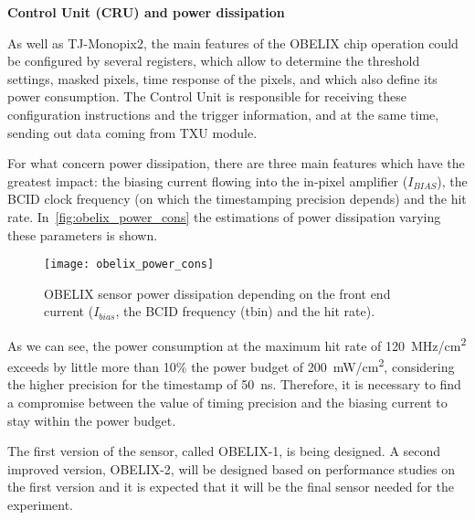 \newpage
\begin{description}
\item \textbf{Control Unit (CRU) and power dissipation}
\end{description}


As well as TJ-Monopix2, the main features of the OBELIX chip operation could be configured by several registers, which allow to determine the threshold settings, masked pixels, time response of the pixels, and which also define its power consumption. The Control Unit is responsible for receiving these configuration instructions and the trigger information, and at the same time, sending out data coming from TXU module.

For what concern power dissipation, there are three main features which have the greatest impact: the biasing current flowing into the in-pixel amplifier (\textit{$I_{BIAS}$}), the BCID clock frequency (on which the timestamping precision depends) and the hit rate. In~\autoref{fig:obelix_power_cons} the estimations of power dissipation varying these parameters is shown.

\begin{figure}[h!]
\centering
\texttt{[image: obelix\_power\_cons]}
\caption{OBELIX sensor power dissipation depending on the front end current (\textbf{$I_{bias}$}, the BCID frequency (tbin) and the hit rate).}
\label{fig:obelix_power_cons}
\end{figure}

As we can see, the power consumption at the maximum hit rate of \SI{120}{MHz/cm^{2}} exceeds by little more than 10\% the power budget of \SI{200}{mW/cm^{2}}, considering the higher precision for the timestamp of \SI{50}{ns}. Therefore, it is necessary to find a compromise between the value of timing precision and the biasing current to stay within the power budget.


The first version of the sensor, called OBELIX-1, is being designed. A second improved version, OBELIX-2, will be designed based on performance studies on the first version and it is expected that it will be the final sensor needed for the experiment.


\begin{comment}

In this chapter we have introduced some of the fundamental aspects of the proposed VTX upgrade, suppported by continuous studies and simulations. In the following we will see in more details the technology on which the whole proposal is based: the CMOS Monolithic Active Pixel Sensor.

\end{comment}


